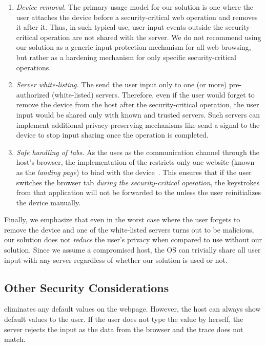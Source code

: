 \begin{enumerate}
	\item \emph{Device removal.} The primary usage model for our solution is one where the user attaches the \device device before a security-critical web operation and removes it after it. Thus, in such typical use, user input events outside the security-critical operation are not shared with the server. We do not recommend using our solution as a generic input protection mechanism for all web browsing, but rather as a hardening mechanism for only specific security-critical operations.

	\item \emph{Server white-listing.} The \device send the user input only to one (or more) pre-authorized (white-listed) servers. Therefore, even if the user would forget to remove the \device device from the host after the security-critical operation, the user input would be shared only with known and trusted servers. Such servers can implement additional privacy-preserving mechanisms like send a signal to the device to stop input sharing once the operation is completed.

	\item \emph{Safe handling of tabs.} As the \device uses \webusb as the communication channel through the host's browser, the implementation of the \webusb restricts only one website (known as the \emph{landing page}) to bind with the \usb device~\cite{webuseb_google}. This ensures that if the user switches the browser tab \emph{during the security-critical operation}, the keystrokes from that application will not be forwarded to the \device unless the user reinitializes the device manually.
\end{enumerate}

Finally, we emphasize that even in the worst case where the user forgets to remove the device and one of the white-listed servers turns out to be malicious, our solution does not \emph{reduce} the user's privacy when compared to use without our solution. Since we assume a compromised host, the OS can trivially share all user input with any server regardless of whether our solution is used or not.



\subsection{Other Security Considerations}

 \name eliminates any default values on the webpage. However, the host can always show default values to the user. If the user does not type the value by herself, the server rejects the input as the data from the browser and the trace does not match.

